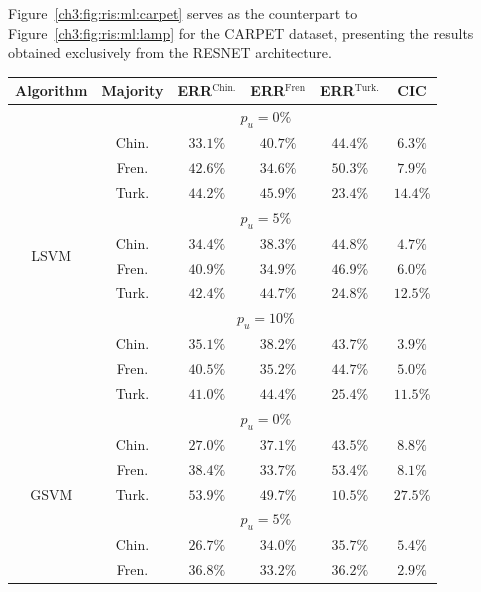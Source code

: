 Figure~\ref{ch3:fig:ris:ml:carpet} serves as the counterpart to Figure~\ref{ch3:fig:ris:ml:lamp} for the CARPET dataset, presenting the results obtained exclusively from the RESNET architecture.
%
\begin{table}
\footnotesize
\centering
\setlength{\tabcolsep}{0.1cm}
\renewcommand{\arraystretch}{1.1}
\begin{tabular}{c|c|c|c|c|c|}
\toprule
\textbf{Algorithm} & \textbf{Majority} & \textbf{ERR$^{\text{Chin.}}$}
& \textbf{ERR$^{\text{Fren}}$}
& \textbf{ERR$^{\text{Turk.}}$} 
& \textbf{CIC} \\
\midrule
\multicolumn{1}{c}{\multirow{12}{*}{LSVM}} & \multicolumn{5}{c}{$p_u = 0\%$}\\
\hhline{~-----}
& Chin. & $33.1\% $ & $40.7\% $ & $44.4\% $ & $6.3\% $ \\
& Fren.& $42.6\% $ & $34.6\% $ & $50.3\% $ & $7.9\% $ \\
& Turk. & $44.2\% $ & $45.9\% $ & $23.4\% $ & $14.4\% $ \\
\hhline{~-----}
\multicolumn{1}{c}{} & \multicolumn{5}{c}{$p_u = 5\%$}\\
\hhline{~-----}
& Chin. & $34.4\% $ & $38.3\% $ & $44.8\% $ & $4.7\% $ \\
& Fren.& $40.9\% $ & $34.9\% $ & $46.9\% $ & $6.0\% $ \\
& Turk. & $42.4\% $ & $44.7\% $ & $24.8\% $ & $12.5\% $ \\
\hhline{~-----}
\multicolumn{1}{c}{} & \multicolumn{5}{c}{$p_u = 10\%$}\\
\hhline{~-----}
& Chin. & $35.1\% $ & $38.2\% $ & $43.7\% $ & $3.9\% $ \\
& Fren.& $40.5\% $ & $35.2\% $ & $44.7\% $ & $5.0\% $ \\
& Turk. & $41.0\% $ & $44.4\% $ & $25.4\% $ & $11.5\% $ \\
\midrule
\multicolumn{1}{c}{\multirow{12}{*}{GSVM}} & \multicolumn{5}{c}{$p_u = 0\%$}\\
\hhline{~-----}
& Chin. & $27.0\% $ & $37.1\% $ & $43.5\% $ & $8.8\% $ \\
& Fren.& $38.4\% $ & $33.7\% $ & $53.4\% $ & $8.1\% $ \\
& Turk. & $53.9\% $ & $49.7\% $ & $10.5\% $ & $27.5\% $ \\
\hhline{~-----}
\multicolumn{1}{c}{} & \multicolumn{5}{c}{$p_u = 5\%$}\\
\hhline{~-----}
& Chin. & $26.7\% $ & $34.0\% $ & $35.7\% $ & $5.4\% $ \\
& Fren.& $36.8\% $ & $ 33.2\% $ & $36.2\% $ & $2.9\% $ \\

\end{tabular}
\end{table}
